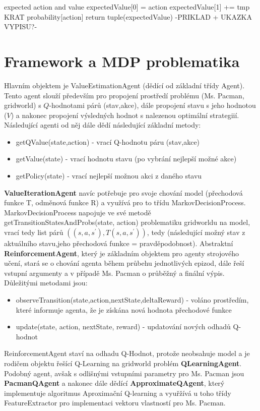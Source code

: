 \begin{enumerate}
        expected action and value
        expectedValue[0] = action
        expectedValue[1] += tmp KRAT probability[action]
    return tuple(expectedValue)
-PRIKLAD + UKAZKA VYPISU?-

\section{Framework a MDP problematika}
Hlavním objektem je ValueEstimationAgent (dědící od základní třídy Agent). Tento agent slouží především pro propojení prostředí problému (Ms. Pacman, gridworld) s $Q$-hodnotami párů (stav,akce), dále propojení stavu s jeho hodnotou ($V$) a nakonec propojení výsledných hodnot s nalezenou optimální strategiií.
Následující agenti od něj dále dědí následující základní metody:
\begin{itemize}
\item getQValue(state,action) - vrací Q-hodnotu páru (stav,akce)
\item getValue(state) - vrací hodnotu stavu (po vybrání nejlepší možné akce)
\item getPolicy(state) - vrací nejlepší možnou akci z daného stavu
\end{itemize}
\textbf{ValueIterationAgent} navíc potřebuje pro svoje chování model (přechodová funkce T, odměnová funkce R) a využívá pro to třídu MarkovDecisionProcess. MarkovDecisionProcess napojuje ve své metodě getTransitionStatesAndProbs(state, action) problematiku gridworldu na model, vrací tedy list párů $((s,a,s^\prime),T(s,a,s^\prime))$, tedy (následující možný stav z aktuálního stavu,jeho přechodová funkce = pravděpodobnost).
\newline
Abstraktní \textbf{ReinforcementAgent}, který je základním objektem pro agenty strojového učení, stará se o chování agenta během průbehu jednotlivých epizod, dále řeší vstupní argumenty a v případě Ms. Pacman o průběžný a finální výpis. Důležitými metodami jsou:
\begin{itemize}
\item observeTransition(state,action,nextState,deltaReward) -  voláno prostředím, které informuje agenta, že je získána nová hodnota přechodové funkce
\item update(state, action, nextState, reward) - updatování nových odhadů Q-hodnot
\end{itemize}
ReinforcementAgent staví na odhadu Q-Hodnot, protože neobsahuje model a je rodičem objektu řešící Q-Learning na gridworld problém \textbf{QLearningAgent}. Podobný agent, avšak s odlišnými vstupními parametry pro Ms. Pacman jsou \textbf{PacmanQAgent} a nakonec dále dědící \textbf{ApproximateQAgent}, který implementuje algoritmus Aproximační Q-learning a vyuřžívá u toho třídy FeatureExtractor pro implementaci vektoru vlastností pro Ms. Pacman.


\end{enumerate}
